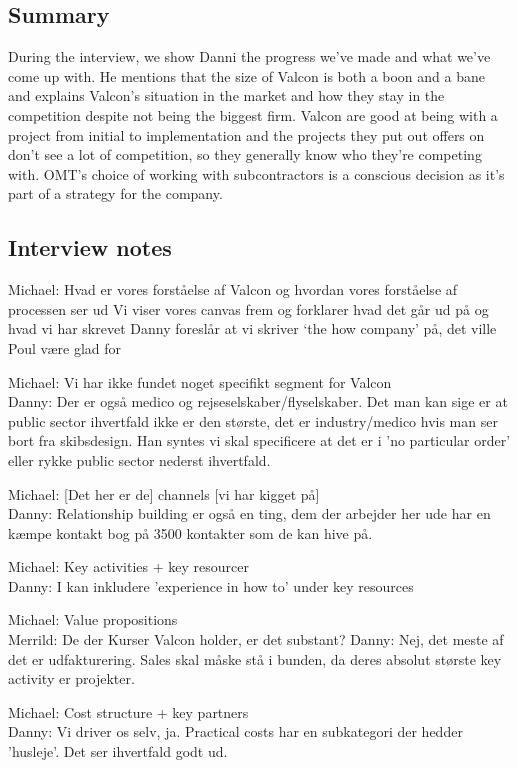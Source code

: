 \label{app:danni_inline}
\subsection{Summary}
During the interview, we show Danni the progress we've made and what we've come up with. 
He mentions that the size of Valcon is both a boon and a bane and explains Valcon's situation in the market and how they stay in the competition despite not being the biggest firm. 
Valcon are good at being with a project from initial to implementation and the projects they put out offers on don't see a lot of competition, so they generally know who they're competing with. 
OMT's choice of working with subcontractors is a conscious decision as it's part of a strategy for the company.

\subsection{Interview notes}
Michael: Hvad er vores forståelse af Valcon og hvordan vores forståelse af processen ser ud
Vi viser vores canvas frem og forklarer hvad det går ud på og hvad vi har skrevet
Danny foreslår at vi skriver ‘the how company’ på, det ville Poul være glad for

Michael: Vi har ikke fundet noget specifikt segment for Valcon\\
Danny: Der er også medico og rejseselskaber/flyselskaber. Det man kan sige er at public sector ihvertfald ikke er den største, det er industry/medico hvis man ser bort fra skibsdesign. Han syntes vi skal specificere at det er i 'no particular order' eller rykke public sector nederst ihvertfald.

Michael: [Det her er de] channels [vi har kigget på]\\
Danny: Relationship building er også en ting, dem der arbejder her ude har en kæmpe kontakt bog på 3500 kontakter som de kan hive på.

Michael: Key activities + key resourcer\\
Danny: I kan inkludere 'experience in how to' under key resources

Michael: Value propositions\\
Merrild: De der Kurser Valcon holder, er det substant?
Danny: Nej, det meste af det er udfakturering. Sales skal måske stå i bunden, da deres absolut største key activity er projekter.

Michael: Cost structure + key partners\\
Danny: Vi driver os selv, ja. Practical costs har en subkategori der hedder 'husleje'. Det ser ihvertfald godt ud.

